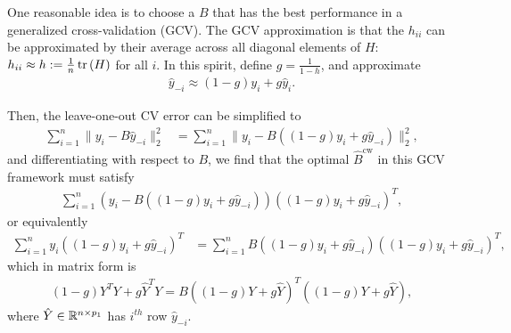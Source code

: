 \documentclass{article}
\begin{document}
One reasonable idea is to choose a $B$ that has the best performance in a
generalized cross-validation (GCV). The GCV approximation is that the $h_{ii}$
can be approximated by their average across all diagonal elements of $H$:
$h_{ii} \approx h := \frac{1}{n}\mathop\mathrm{tr}\left(H\right)$ for all $i$. In this spirit,
define $g = \frac{1}{1 - h}$, and approximate
\begin{align*}
  \hat{y}_{-i} \approx \left(1 - g\right)y_{i} + g\hat{y}_{i}.
\end{align*}

Then, the leave-one-out CV error can be simplified to
\begin{align*}
  \sum_{i = 1}^{n}\|y_{i} - B\hat{y}_{-i}\|_{2}^{2} &= \sum_{i =
    1}^{n} \|y_{i} - B\left(\left(1 - g\right)y_{i} +
    g\hat{y}_{-i}\right)\|_{2}^{2},
\end{align*}
and differentiating with respect to $B$, we find that the optimal
$\hat{B}^{\text{cw}}$ in this GCV framework must satisfy
\begin{align*}
\sum_{i = 1}^{n}\left(y_{i} - B\left(\left(1 - g\right)y_{i} +
    g\hat{y}_{-i}\right)\right)\left(\left(1 - g\right)y_{i} +
  g\hat{y}_{-i}\right)^{T},
\end{align*}
or equivalently
\begin{align*}
\sum_{i = 1}^{n} y_{i}\left(\left(1 - g\right)y_{i} +
  g\hat{y}_{-i}\right)^{T} &=  \sum_{i = 1}^{n}B\left(\left(1 -
    g\right)y_{i} + g\hat{y}_{-i}\right)\left(\left(1 - g\right)y_{i}
  +  g\hat{y}_{-i}\right)^{T},
\end{align*}
which in matrix form is
\begin{align}
\left(1 - g\right)Y^{T}Y + g\hat{Y}^{T}Y = B\left(\left(1 - g\right)Y
  + g \hat{Y}\right)^{T}\left(\left(1 - g\right)Y + g \hat{Y}\right), \label{eq:gcv_mat_form}
\end{align}
where $\hat{Y} \in \mathbb{R}^{n \times p_{1}}$ has $i^{th}$ row
$\hat{y}_{-i}$.
\end{document}
